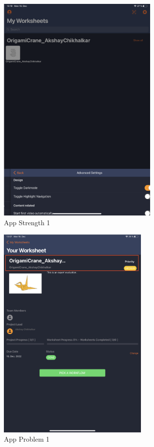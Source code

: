 \documentclass[conference,onecolumn]{IEEEtran}
\begin{document}
    \begin{figure}[H]
        \centerline{\includegraphics[width=80mm,scale=1]{./images/App_Strength_1.png}}
        \caption{App Strength 1}
        \label{App Strength 1}
    \end{figure}
    \begin{figure}[H]
        \centerline{\includegraphics[width=75mm,scale=1]{./images/App_Problem_1.png}}
        \caption{App Problem 1}
        \label{App Problem 1}
    \end{figure}
\end{document}
